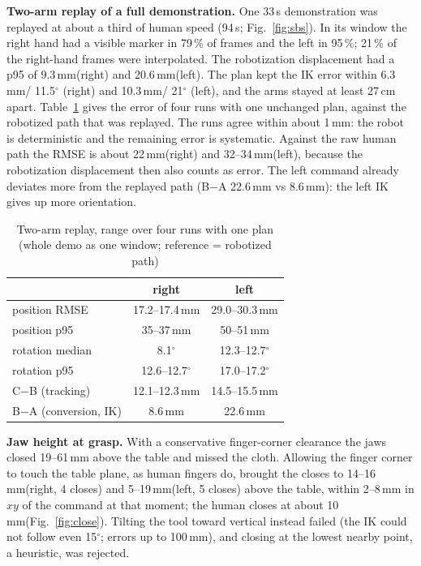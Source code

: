 \documentclass[conference,10pt]{IEEEtran}
\newcommand{\mm}{\,mm\xspace}
\begin{document}
\textbf{Two-arm replay of a full demonstration.} One 33\,s demonstration was replayed at about a third of human speed
(94\,s; Fig.~\ref{fig:sbs}). In its window the right hand had a visible marker in 79\,\% of frames and the left in
95\,\%; 21\,\% of the right-hand frames were interpolated. The robotization displacement had a p95 of 9.3\mm (right) and
20.6\mm (left). The plan kept the IK error within 6.3\mm / 11.5$^\circ$ (right) and 10.3\mm / 21$^\circ$ (left), and the
arms stayed at least 27\,cm apart. Table~\ref{tab:rep} gives the error of four runs with one unchanged plan, against the
robotized path that was replayed. The runs agree within about 1\mm: the robot is deterministic and the remaining error
is systematic. Against the raw human path the RMSE is about 22\mm (right) and 32--34\mm (left), because the robotization
displacement then also counts as error. The left command already deviates more from the replayed path (B$-$A 22.6\mm vs
8.6\mm): the left IK gives up more orientation.

\begin{table}[t]
\caption{Two-arm replay, range over four runs with one plan (whole demo as one window; reference = robotized path)}\label{tab:rep}
\centering\small
\begin{tabular}{@{}lcc@{}}
\toprule
 & right & left \\
\midrule
position RMSE & 17.2--17.4\mm & 29.0--30.3\mm \\
position p95 & 35--37\mm & 50--51\mm \\
rotation median & 8.1$^\circ$ & 12.3--12.7$^\circ$ \\
rotation p95 & 12.6--12.7$^\circ$ & 17.0--17.2$^\circ$ \\
C$-$B (tracking) & 12.1--12.3\mm & 14.5--15.5\mm \\
B$-$A (conversion, IK) & 8.6\mm & 22.6\mm \\
\bottomrule
\end{tabular}
\end{table}

\textbf{Jaw height at grasp.} With a conservative finger-corner clearance the jaws closed 19--61\mm above the table and
missed the cloth. Allowing the finger corner to touch the table plane, as human fingers do, brought the closes to
14--16\mm (right, 4 closes) and 5--19\mm (left, 5 closes) above the table, within 2--8\mm in $xy$ of the command at that
moment; the human closes at about 10\mm (Fig.~\ref{fig:close}). Tilting the tool toward vertical instead failed (the IK
could not follow even 15$^\circ$; errors up to 100\mm), and closing at the lowest nearby point, a heuristic, was rejected.
\end{document}
